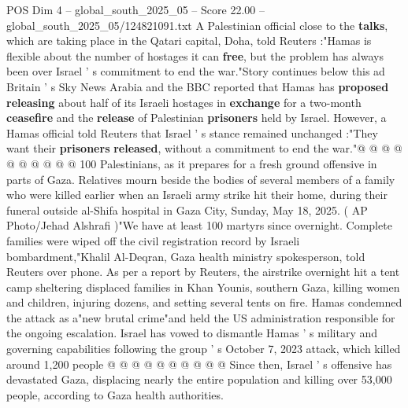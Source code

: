 \begin{textsample}{POS Dim 4 – global\_south\_2025\_05 – Score 22.00 – global\_south\_2025\_05/124821091.txt}
A Palestinian official close to the \textbf{talks}, which are taking place in the Qatari capital, Doha, told Reuters :"Hamas is flexible about the number of hostages it can \textbf{free}, but the problem has always been over Israel ' s commitment to end the war."Story continues below this ad Britain ' s Sky News Arabia and the BBC reported that Hamas has \textbf{proposed} \textbf{releasing} about half of its Israeli hostages in \textbf{exchange} for a two-month \textbf{ceasefire} and the \textbf{release} of Palestinian \textbf{prisoners} held by Israel.
However, a Hamas official told Reuters that Israel ' s stance remained unchanged :"They want their \textbf{prisoners} \textbf{released}, without a commitment to end the war."@ @ @ @ @ @ @ @ @ @ 100 Palestinians, as it prepares for a fresh ground offensive in parts of Gaza.
Relatives mourn beside the bodies of several members of a family who were killed earlier when an Israeli army strike hit their home, during their funeral outside al-Shifa hospital in Gaza City, Sunday, May 18, 2025. ( AP Photo/Jehad Alshrafi )"We have at least 100 martyrs since overnight.
Complete families were wiped off the civil registration record by Israeli bombardment,"Khalil Al-Deqran, Gaza health ministry spokesperson, told Reuters over phone.
As per a report by Reuters, the airstrike overnight hit a tent camp sheltering displaced families in Khan Younis, southern Gaza, killing women and children, injuring dozens, and setting several tents on fire.
Hamas condemned the attack as a"new brutal crime"and held the US administration responsible for the ongoing escalation.
Israel has vowed to dismantle Hamas ' s military and governing capabilities following the group ' s October 7, 2023 attack, which killed around 1,200 people @ @ @ @ @ @ @ @ @ @ Since then, Israel ' s offensive has devastated Gaza, displacing nearly the entire population and killing over 53,000 people, according to Gaza health authorities.

\end{textsample}

